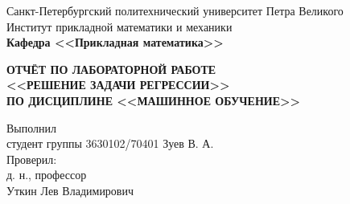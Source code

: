 \documentclass[main.tex]{subfiles}
\begin{document}
\begin{titlepage}
\begin{center}
	\begin{large}
		Санкт-Петербургский политехнический университет Петра Великого\\
		Институт прикладной математики и механики\\
		\textbf{Кафедра <<Прикладная математика>>}\\
	\end{large}
	\vfill
	\Large{\textbf{ОТЧЁТ ПО ЛАБОРАТОРНОЙ РАБОТЕ\\
	<<РЕШЕНИЕ ЗАДАЧИ РЕГРЕССИИ>>\\
	ПО ДИСЦИПЛИНЕ <<МАШИННОЕ ОБУЧЕНИЕ>>}}
\end{center}
\vfill
\flushleft
Выполнил\\
студент группы 3630102/70401
\flushright
Зуев В. А.\\
\flushleft
Проверил:\\
д. н., профессор\\
\flushright
Уткин Лев Владимирович\\
\vfill
{}
\end{titlepage}
\end{document}
